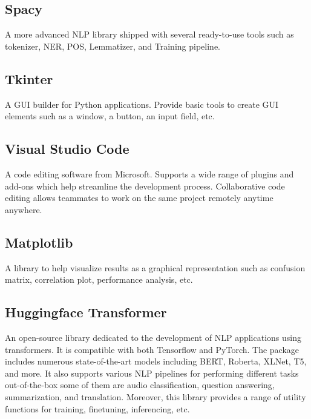 \documentclass[12pt,oneside,openright,a4paper]{cpe-english-project}
\begin{document}
\subsection{Spacy} 
A more advanced NLP library shipped with several ready-to-use tools such as tokenizer, NER, POS, Lemmatizer, and Training pipeline.  

\subsection{Tkinter} 
A GUI builder for Python applications. Provide basic tools to create GUI elements such as a window, a button, an input field, etc. 

\subsection{Visual Studio Code} 
A code editing software from Microsoft. Supports a wide range of plugins and add-ons which help streamline the development process. Collaborative code editing allows teammates to work on the same project remotely anytime anywhere. 

\subsection{Matplotlib} 
A library to help visualize results as a graphical representation such as confusion matrix, correlation plot, performance analysis, etc. 



\subsection{Huggingface Transformer} 
An open-source library dedicated to the development of NLP applications using transformers. It is compatible with both Tensorflow and PyTorch. The package includes numerous state-of-the-art models including BERT, Roberta, XLNet, T5, and more. It also supports various NLP pipelines for performing different tasks out-of-the-box some of them are audio classification, question answering, summarization, and translation. Moreover, this library provides a range of utility functions for training, finetuning, inferencing, etc.
\end{document}
